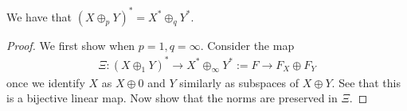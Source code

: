 \begin{proposition}
  We have that $(X \oplus_p Y)^* = X^* \oplus_q Y^*$.
\end{proposition}
\begin{proof}
  We first show when $p = 1, q = \infty$. Consider the map
  \begin{align*}
    \Xi: (X \oplus_1 Y)^* \to X^* \oplus_\infty Y^* := F \to F_X \oplus F_Y
  \end{align*}
  once we identify $X$ as $X \oplus 0$ and $Y$ similarly as subspaces
  of $X \oplus Y$. See that this is a bijective linear map. Now show
  that the norms are preserved in $\Xi$.
\end{proof}
